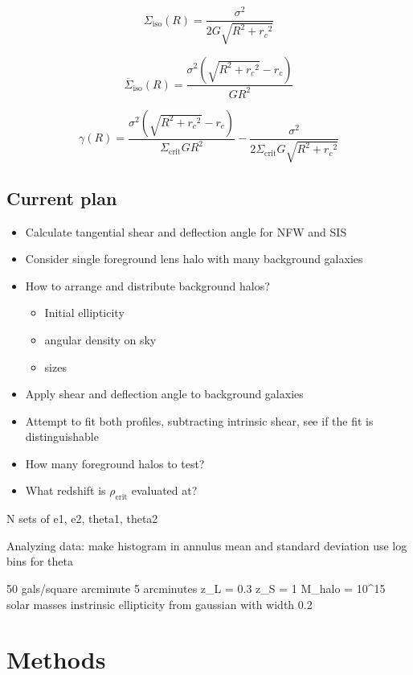 \documentclass[]{article}
\begin{document}
\begin{equation}
    \Sigma_\mathrm{iso}(R) = \frac{\sigma^2}{2 G \sqrt{R^2 + {r_c}^2}}
\end{equation}

\begin{equation}
    \overline{\Sigma}_\mathrm{iso}(R) = \frac{\sigma^2 \left(\sqrt{R^2 + {r_c}^2} - r_c \right)}{G R^2}
\end{equation}

\begin{equation}
    \gamma(R) = \frac{\sigma^2 \left(\sqrt{R^2 + {r_c}^2} - r_c \right)}{\Sigma_\mathrm{crit} G R^2} - \frac{\sigma^2}{2 \Sigma_\mathrm{crit} G \sqrt{R^2 + {r_c}^2}}
\end{equation}




\subsection{Current plan}
\begin{itemize}
    \item Calculate tangential shear and deflection angle for NFW and SIS
    \item Consider single foreground lens halo with many background galaxies
    \item How to arrange and distribute background halos?
    \begin{itemize}
        \item Initial ellipticity
        \item angular density on sky
        \item sizes
    \end{itemize}
    \item Apply shear and deflection angle to background galaxies
    \item Attempt to fit both profiles, subtracting intrinsic shear, see if the fit is distinguishable
    \item How many foreground halos to test?
    \item What redshift is $\rho_\mathrm{crit}$ evaluated at?

\end{itemize}

N sets of e1, e2, theta1, theta2

Analyzing data:
make histogram in annulus
mean and standard deviation
use log bins for theta


50 gals/square arcminute
5 arcminutes
z_L = 0.3
z_S = 1
M_halo = 10^15 solar masses
instrinsic ellipticity from gaussian with width 0.2


\section{Methods}
\end{document}
